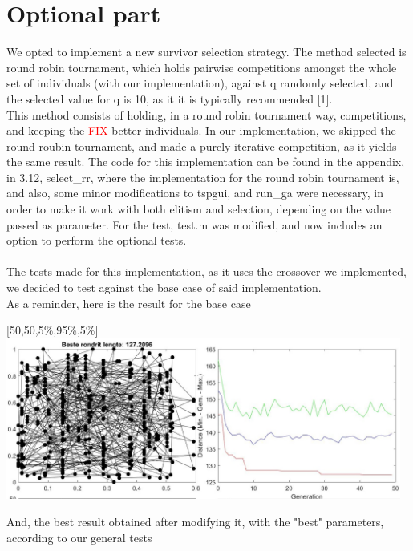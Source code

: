 \section{Optional part}

We opted to implement a new survivor selection strategy. The method selected
is round robin tournament, which holds pairwise competitions amongst the
whole set of individuals (with our implementation), against q randomly
selected, and the selected value for q is 10, as it it is typically
recommended [1].\\ 
This method consists of holding, in a round robin tournament way,
competitions, and keeping the \mu \textcolor{red}{FIX} better individuals. In our
implementation, we skipped the round roubin tournament, and made a purely
iterative competition, as it yields the same result. 
The code for this implementation can be found in the appendix, in 3.12,
select\_rr, where the implementation for the round robin tournament is, and
also, some minor modifications to tspgui, and run\_ga were necessary, in
order to make it work with both elitism and selection, depending on the value
passed as parameter. For the test, test.m was modified, and now includes
an option to perform the optional tests.\\
\\
The tests made for this implementation, as it uses the crossover we
implemented, we decided to test against the base case of said
implementation. \\
As a reminder, here is the result for the base case\\

\begin{center}
[50,50,5\%,95\%,5\%]\\
\includegraphics[width=13cm]{img/specific/order_crossover/general_1.jpg}
\end{center}

And, the best result obtained after modifying it, with the "best"
parameters, according to our general tests\\


